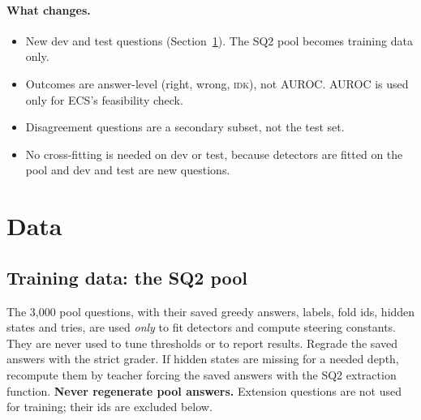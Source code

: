 \documentclass[11pt]{article}
\newcommand{\IDK}{\textsc{idk}}
\begin{document}
\paragraph{What changes.}
\begin{itemize}
  \item New dev and test questions (Section~\ref{sec:data}). The SQ2 pool becomes training data only.
  \item Outcomes are answer-level (right, wrong, \IDK), not AUROC. AUROC is used only for ECS's
        feasibility check.
  \item Disagreement questions are a secondary subset, not the test set.
  \item No cross-fitting is needed on dev or test, because detectors are fitted on the pool and dev and
        test are new questions.
\end{itemize}

\section{Data}\label{sec:data}

\subsection{Training data: the SQ2 pool}
The 3,000 pool questions, with their saved greedy answers, labels, fold ids, hidden states and tries, are used
\emph{only} to fit detectors and compute steering constants. They are never used to tune thresholds or to
report results. Regrade the saved answers with the strict grader. If hidden states are missing for a needed
depth, recompute them by teacher forcing the saved answers with the SQ2 extraction function. \textbf{Never
regenerate pool answers.} Extension questions are not used for training; their ids are excluded below.
\end{document}
